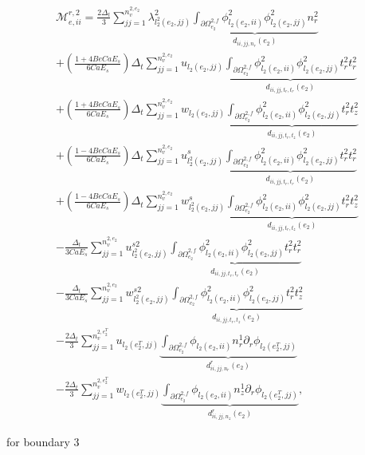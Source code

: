 \documentclass{article}
\begin{document}
\begin{equation}
\begin{array}{l} \mathcal{M}_{e,ii}^{r,2} = \frac{2\Delta_t}{3} \sum_{jj=1}^{n_v^{2,e_2}} \lambda_{l_2^2(e_2,jj)}^2 \underbrace{ \int_{\partial \Omega_{e_2}^{2,f}} \phi_{l_2(e_2,ii)}^2 \phi_{l_2(e_2,jj)}^2 n_r^2 }_{d_{ii,jj,n_r}(e_2)} \\ + \left( \frac{1 + 4Be Ca E_s}{6Ca E_s} \right) \Delta_t \sum_{jj=1}^{n_v^{2,e_2}} u_{l_2(e_2,jj)} \underbrace{ \int_{\partial \Omega_{e_2}^{2,f}} \phi_{l_2(e_2,ii)}^2 \phi_{l_2(e_2,jj)}^2 t_r^2 t_r^2 }_{d_{ii,jj,t_r,t_r}(e_2)} \\ + \left( \frac{1 + 4Be Ca E_s}{6Ca E_s} \right) \Delta_t \sum_{jj=1}^{n_v^{2,e_2}} w_{l_2(e_2,jj)} \underbrace{ \int_{\partial \Omega_{e_2}^{2,f}} \phi_{l_2(e_2,ii)}^2 \phi_{l_2(e_2,jj)}^2 t_r^2 t_z^2 }_{d_{ii,jj,t_r,t_z}(e_2)} \\ + \left( \frac{1 - 4Be Ca E_s}{6Ca E_s} \right) \Delta_t \sum_{jj=1}^{n_v^{2,e_2}} u_{l_2^2(e_2,jj)}^s \underbrace{ \int_{\partial \Omega_{e_2}^{2,f}} \phi_{l_2(e_2,ii)}^2 \phi_{l_2(e_2,jj)}^2 t_r^2 t_r^2 }_{d_{ii,jj,t_r,t_r}(e_2)} \\ + \left( \frac{1 - 4Be Ca E_s}{6Ca E_s} \right) \Delta_t \sum_{jj=1}^{n_v^{2,e_2}} w_{l_2^2(e_2,jj)}^s \underbrace{ \int_{\partial \Omega_{e_2}^{2,f}} \phi_{l_2(e_2,ii)}^2 \phi_{l_2(e_2,jj)}^2 t_r^2 t_z^2 }_{d_{ii,jj,t_r,t_z}(e_2)} \\ - \frac{\Delta_t}{3Ca E_s} \sum_{jj=1}^{n_v^{2,e_2}} u_{l_2^2(e_2,jj)}^{s2} \underbrace{ \int_{\partial \Omega_{e_2}^{2,f}} \phi_{l_2(e_2,ii)}^2 \phi_{l_2(e_2,jj)}^2 t_r^2 t_r^2 }_{d_{ii,jj,t_r,t_r}(e_2)} \\ - \frac{\Delta_t}{3Ca E_s} \sum_{jj=1}^{n_v^{2,e_2}} w_{l_2^2(e_2,jj)}^{s2} \underbrace{ \int_{\partial \Omega_{e_2}^{2,f}} \phi_{l_2(e_2,ii)}^2 \phi_{l_2(e_2,jj)}^2 t_r^2 t_z^2 }_{d_{ii,jj,t_r,t_z}(e_2)} \\ - \frac{2\Delta_t}{3} \sum_{jj=1}^{n_v^{2,e_2^T}} u_{l_2(e_2^T,jj)} \underbrace{ \int_{\partial \Omega_{e_2}^{2,f}} \phi_{l_2(e_2,ii)} n_r^1 \partial_r \phi_{l_2(e_2^T,jj)} }_{d_{ii,jj,n_r}^r(e_2)} \\ - \frac{2\Delta_t}{3} \sum_{jj=1}^{n_v^{2,e_2^T}} w_{l_2(e_2^T,jj)} \underbrace{ \int_{\partial \Omega_{e_2}^{2,f}} \phi_{l_2(e_2,ii)} n_z^1 \partial_r \phi_{l_2(e_2^T,jj)} }_{d_{ii,jj,n_z}^r(e_2)}, \end{array} \tag{4.137}
\end{equation}

for boundary 3
\end{document}
